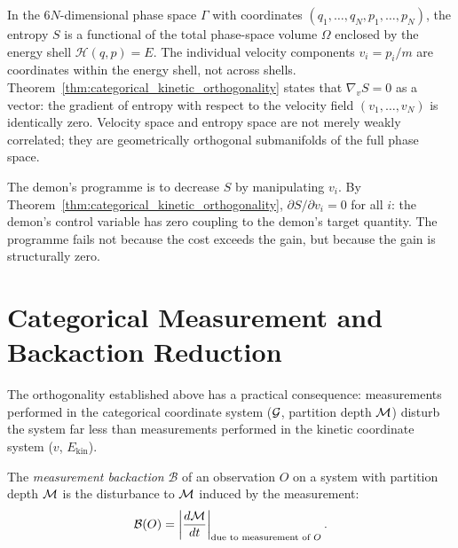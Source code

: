 \begin{remark}
In the $6N$-dimensional phase space $\Gamma$ with coordinates $(q_1, \ldots, q_N, p_1, \ldots, p_N)$,
the entropy $S$ is a functional of the total phase-space volume $\Omega$ enclosed
by the energy shell $\mathcal{H}(q,p) = E$. The individual velocity components
$v_i = p_i / m$ are coordinates within the energy shell, not across shells.
Theorem~\ref{thm:categorical_kinetic_orthogonality} states that $\nabla_{v} S = 0$
as a vector: the gradient of entropy with respect to the velocity field
$(v_1, \ldots, v_N)$ is identically zero. Velocity space and entropy space
are not merely weakly correlated; they are geometrically orthogonal submanifolds
of the full phase space.
\end{remark}

\begin{corollary}
\label{cor:demon_one_equation}
The demon's programme is to decrease $S$ by manipulating $v_i$. By
Theorem~\ref{thm:categorical_kinetic_orthogonality}, $\partial S / \partial v_i = 0$
for all $i$: the demon's control variable has zero coupling to the demon's
target quantity. The programme fails not because the cost exceeds the gain,
but because the gain is structurally zero.
\end{corollary}

\section{Categorical Measurement and Backaction Reduction}
\label{sec:categorical_measurement}

The orthogonality established above has a practical consequence: measurements
performed in the categorical coordinate system ($\mathcal{G}$, partition
depth $\mathcal{M}$) disturb the system far less than measurements performed in the
kinetic coordinate system ($v$, $E_{\mathrm{kin}}$).

\begin{definition}
\label{def:measurement_backaction}
The \emph{measurement backaction} $\mathcal{B}$ of an observation $O$ on a
system with partition depth $\mathcal{M}$ is the disturbance to $\mathcal{M}$ induced
by the measurement:
\begin{equation}
  \mathcal{B}(O) = \left|\frac{d\mathcal{M}}{dt}\right|_{\text{due to measurement of }O}.
  \label{eq:backaction_def}
\end{equation}
\end{definition}

